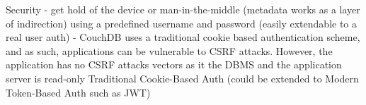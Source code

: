 \documentclass[thesis.tex]{subfiles}
\begin{document}
Security
- get hold of the device or man-in-the-middle (metadata works as a layer of indirection)
using a predefined username and password (easily extendable to a real user auth)
- CouchDB uses a traditional cookie based authentication scheme, and as such, applications can be vulnerable to CSRF attacks. However, the application has no CSRF attacks vectors as it the DBMS and the application server is read-only
Traditional Cookie-Based Auth (could be extended to Modern Token-Based Auth such as JWT)
\end{document}
